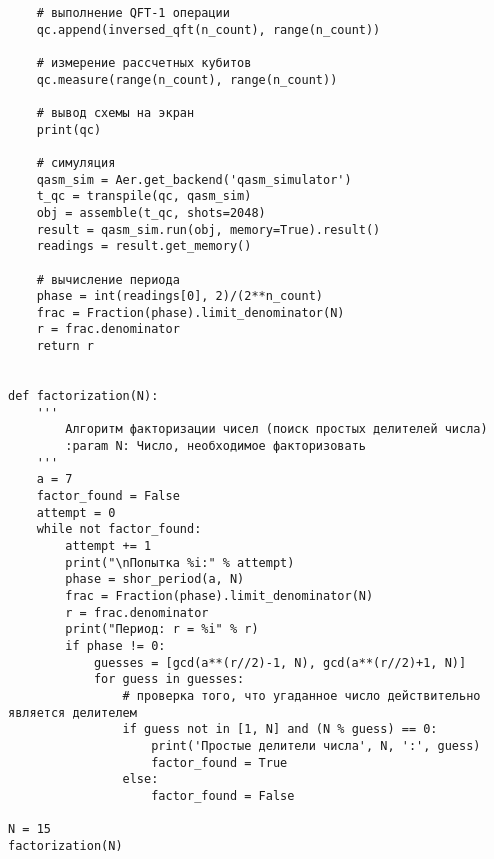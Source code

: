 \begin{verbatim}
    # выполнение QFT-1 операции
    qc.append(inversed_qft(n_count), range(n_count))

    # измерение рассчетных кубитов
    qc.measure(range(n_count), range(n_count))

    # вывод схемы на экран
    print(qc)

    # симуляция
    qasm_sim = Aer.get_backend('qasm_simulator')
    t_qc = transpile(qc, qasm_sim)
    obj = assemble(t_qc, shots=2048)
    result = qasm_sim.run(obj, memory=True).result()
    readings = result.get_memory()

    # вычисление периода
    phase = int(readings[0], 2)/(2**n_count)
    frac = Fraction(phase).limit_denominator(N)
    r = frac.denominator
    return r


def factorization(N):
    '''
        Алгоритм факторизации чисел (поиск простых делителей числа)
        :param N: Число, необходимое факторизовать
    '''
    a = 7
    factor_found = False
    attempt = 0
    while not factor_found:
        attempt += 1
        print("\nПопытка %i:" % attempt)
        phase = shor_period(a, N)
        frac = Fraction(phase).limit_denominator(N)
        r = frac.denominator
        print("Период: r = %i" % r)
        if phase != 0:
            guesses = [gcd(a**(r//2)-1, N), gcd(a**(r//2)+1, N)]
            for guess in guesses:
                # проверка того, что угаданное число действительно является делителем
                if guess not in [1, N] and (N % guess) == 0:
                    print('Простые делители числа', N, ':', guess)
                    factor_found = True
                else:
                    factor_found = False

N = 15
factorization(N)
\end{verbatim}

\newpage


